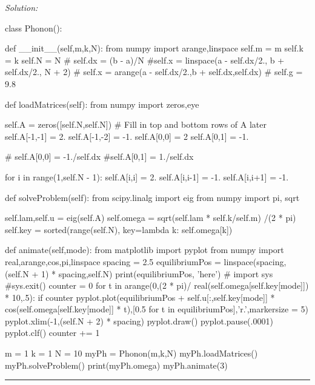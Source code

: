 \ifsolutions
\textit{Solution:}\\
\begin{codeexample}
\begin{VerbatimOut}{\listingFile}


class Phonon():

    def __init__(self,m,k,N):
        from numpy import arange,linspace
        self.m = m
        self.k = k
        self.N = N
        #        self.dx = (b - a)/N
        #self.x = linspace(a - self.dx/2., b + self.dx/2., N + 2)
        #        self.x = arange(a - self.dx/2.,b + self.dx,self.dx)
        # self.g = 9.8

    def loadMatrices(self):
        from numpy import zeros,eye
        
        self.A = zeros([self.N,self.N])
        # Fill in top and bottom rows of A later
        self.A[-1,-1] = 2.
        self.A[-1,-2] = -1.
        self.A[0,0] = 2
        self.A[0,1] = -1.

        #        self.A[0,0] = -1./self.dx
        #self.A[0,1] = 1./self.dx
        
        
        for i in range(1,self.N - 1):
            self.A[i,i] = 2.
            self.A[i,i-1] = -1.
            self.A[i,i+1] =  -1.

        

    def solveProblem(self):
        from scipy.linalg import eig
        from numpy import pi, sqrt
        
        self.lam,self.u = eig(self.A)
        self.omega = sqrt(self.lam * self.k/self.m) /(2 * pi)
        self.key = sorted(range(self.N), key=lambda k: self.omega[k])

    def animate(self,mode):
        from matplotlib import pyplot
        from numpy import real,arange,cos,pi,linspace
        spacing = 2.5
        equilibriumPos = linspace(spacing,(self.N + 1) * spacing,self.N)
        print(equilibriumPos, 'here')
        #  import sys
        #sys.exit()
        counter = 0
        for t in arange(0,(2 * pi)/ real(self.omega[self.key[mode]]) * 10,.5):
            if counter %
                pyplot.plot(equilibriumPos + self.u[:,self.key[mode]] * cos(self.omega[self.key[mode]] * t),[0.5 for t in equilibriumPos],'r.',markersize = 5)
                pyplot.xlim(-1,(self.N + 2) * spacing)
                pyplot.draw()
                pyplot.pause(.0001)
                pyplot.clf()
            counter += 1

m = 1
k = 1
N = 10
myPh = Phonon(m,k,N)
myPh.loadMatrices()
myPh.solveProblem()
print(myPh.omega)
myPh.animate(3)




\end{VerbatimOut}
\end{codeexample}
\else
\noindent\rule{5 in}{0.01 in}
\fi


